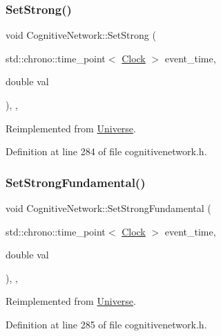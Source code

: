 \subsubsection{\texorpdfstring{Set\+Strong()}{SetStrong()}}
{\footnotesize\ttfamily void Cognitive\+Network\+::\+Set\+Strong (\begin{DoxyParamCaption}\item[{std\+::chrono\+::time\+\_\+point$<$ \hyperlink{universe_8h_a0ef8d951d1ca5ab3cfaf7ab4c7a6fd80}{Clock} $>$}]{event\+\_\+time,  }\item[{double}]{val }\end{DoxyParamCaption})\hspace{0.3cm}{\ttfamily [inline]}, {\ttfamily [final]}, {\ttfamily [virtual]}}



Reimplemented from \hyperlink{class_universe_a5946c8f3d4cda305f3ecd10df21a2f94}{Universe}.



Definition at line 284 of file cognitivenetwork.\+h.

\mbox{\label{class_cognitive_network_ac54286eea279f5caa98b642b9084fd55}} 
\subsubsection{\texorpdfstring{Set\+Strong\+Fundamental()}{SetStrongFundamental()}}
{\footnotesize\ttfamily void Cognitive\+Network\+::\+Set\+Strong\+Fundamental (\begin{DoxyParamCaption}\item[{std\+::chrono\+::time\+\_\+point$<$ \hyperlink{universe_8h_a0ef8d951d1ca5ab3cfaf7ab4c7a6fd80}{Clock} $>$}]{event\+\_\+time,  }\item[{double}]{val }\end{DoxyParamCaption})\hspace{0.3cm}{\ttfamily [inline]}, {\ttfamily [final]}, {\ttfamily [virtual]}}



Reimplemented from \hyperlink{class_universe_aafec97a231126b71c73ac1258609a284}{Universe}.



Definition at line 285 of file cognitivenetwork.\+h.

